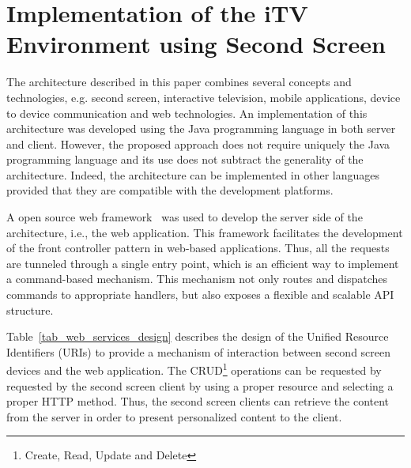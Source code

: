 \documentclass[journal]{IEEEtran}
\begin{document}


\section{Implementation of the iTV Environment using Second Screen}

The architecture described in this paper combines several concepts and technologies, e.g. second screen, interactive television, mobile applications, device to device communication and web technologies. An implementation of this architecture was developed using the Java programming language in both server and client. However, the proposed approach does not require uniquely the Java programming language and its use does not subtract the generality of the architecture. Indeed, the architecture can be implemented in other languages provided that they are compatible with the development platforms.

A open source web framework~\cite{Walls2011} was used to develop the server side of the architecture, i.e., the web application. This framework facilitates the development of the front controller pattern in web-based applications. Thus, all the requests are tunneled through a single entry point, which is an efficient way to implement a command-based mechanism. This mechanism not only routes and dispatches commands to appropriate handlers, but also exposes a flexible and scalable API structure.

Table~\ref{tab_web_services_design} describes the design of the Unified Resource Identifiers (URIs) to provide a mechanism of interaction between second screen devices and the web application. The CRUD\footnote{Create, Read, Update and Delete} operations can be requested by requested by the second screen client by using a proper resource and selecting a proper HTTP method. Thus, the second screen clients can retrieve the content from the server in order to present personalized content to the client.
\end{document}
